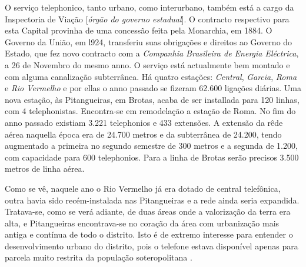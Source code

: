 \begin{citacao}
O serviço telephonico, tanto urbano, como interurbano, também está a cargo da Inspectoria de Viação [\textit{órgão do governo estadual}].
O contracto respectivo para esta Capital provinha de uma concessão feita pela Monarchia, em 1884.
O Governo da União, em l924, transferiu suas obrigações e direitos ao Governo do Estado, que fez novo contracto com a \textit{Companhia Brasileira de Energia Eléctrica}, a 26 de Novembro do mesmo anno.
O serviço está actualmente bem montado e com alguma canalização subterrânea.
Há quatro estações: \textit{Central}, \textit{Garcia}, \textit{Roma} e \textit{Rio Vermelho} e por ellas o anno passado se fizeram 62.600 ligações diárias.
Uma nova estação, às Pitangueiras, em Brotas, acaba de ser installada para 120 linhas, com 4 telephonistas.
Encontra-se em remodelação a estação de Roma.
No fim do anno passado existiam 3.221 telephonios e 433 extensões.
A extensão da rêde aérea naquella época era de 24.700 metros e da subterrânea de 24.200, tendo augmentado a primeira no segundo semestre de 300 metros e a segunda
de 1.200, com capacidade para 600 telephonios.
Para a linha de Brotas serão precisos 3.500 metros de linha aérea. \cite[pp.~266-267]{bahia_rpe_1926}
\end{citacao}

Como se vê, naquele ano o Rio Vermelho já era dotado de central telefônica, outra havia sido recém-instalada nas Pitangueiras e a rede ainda seria expandida. Tratava-se, como se verá adiante, de duas áreas onde a valorização da terra era alta, e Pitangueiras encontrava-se no coração da área com urbanização mais antiga e contínua de todo o distrito. Isto é de extremo interesse para entender o desenvolvimento urbano do distrito, pois o telefone estava disponível apenas para parcela muito restrita da população soteropolitana \cite[pp.~256-257]{SAMPAIO2005}.

